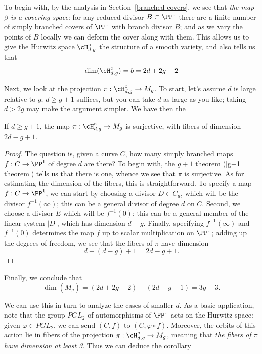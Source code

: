 To begin with, by the analysis in Section~\ref{branched covers}, we see that \emph{the map $\beta$ is a covering space}: for any reduced divisor $B \subset \PP^1$ there are a finite number of simply branched covers of $\PP^1$ with branch divisor $B$; and as we vary the points of $B$ locally we can deform the cover along with them. This allows us to give the Hurwitz space $\cH^\circ_{d,g}$ the structure of a smooth variety, and also tells us that
$$
\dim(\cH^\circ_{d,g}) = b = 2d+2g-2
$$

Next, we look at the projection $\pi : \cH^\circ_{d,g} \to M_g$. To start, let's assume $d$ is large relative to $g$; $d \geq g+1$ suffices, but you can take $d$ as large as you like; taking $d > 2g$ may make the argument simpler. We have then the

\begin{proposition}
If $d \geq g+1$, the map $\pi : \cH^\circ_{d,g} \to M_g$ is surjective, with fibers of dimension $2d-g+1$.
\end{proposition}

\begin{proof}
The question is, given a curve $C$, how many simply branched maps $f : C \to \PP^1$ of degree $d$ are there? To begin with, the $g+1$ theorem (\ref{g+1 theorem}) tells us that there is one, whence we see that $\pi$ is surjective. As for estimating the dimension of the fibers, this is straightforward. To specify a map $f : C \to \PP^1$, we can start by choosing a divisor $D \in C_d$, which will be the divisor $f^{-1}(\infty)$; this can be a general divisor of degree $d$ on $C$. Second, we choose a divisor $E$ which will be $f^{-1}(0)$; this can be a general member of the linear system $|D|$, which has dimension $d-g$. Finally, specifying $f^{-1}(\infty)$ and $f^{-1}(0)$ determines the map $f$ up to scalar multiplication on $\PP^1$; adding up the degrees of freedom, we see that the fibers of $\pi$ have dimension
$$
d + (d-g) + 1 = 2d-g+1.
$$ 
\end{proof}

Finally, we conclude that
$$
\dim(M_g) = (2d+2g-2) - (2d - g + 1) = 3g-3.
$$

We can use this in turn to analyze the cases of smaller $d$. As a basic application, note that the group $PGL_2$ of automorphisms of $\PP^1$ acts on the Hurwitz space: given $\varphi \in PGL_2$, we can send $(C,f)$ to $(C, \varphi \circ f)$. Moreover, the orbits of this action lie in fibers of the projection $\pi : \cH^\circ_{d,g} \to M_g$, meaning that \emph{the fibers of $\pi$ have dimension at least 3}. Thus we can deduce the corollary

